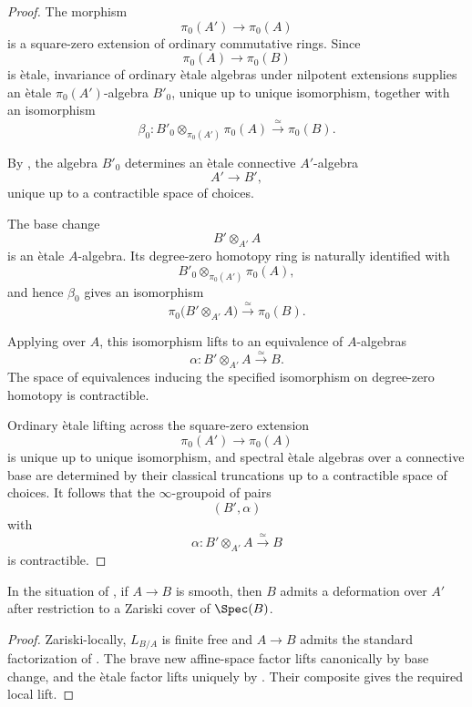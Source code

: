 \begin{proof}
The morphism
\[
    \pi_0(A')
    \longrightarrow
    \pi_0(A)
\]
is a square-zero extension of ordinary commutative rings. Since
\[
    \pi_0(A)
    \longrightarrow
    \pi_0(B)
\]
is \`etale, invariance of ordinary \`etale algebras under nilpotent
extensions supplies an \`etale \(\pi_0(A')\)-algebra \(B'_0\), unique up
to unique isomorphism, together with an isomorphism
\[
    \beta_0
    \colon
    B'_0
    \otimes_{\pi_0(A')}
    \pi_0(A)
    \xrightarrow{\simeq}
    \pi_0(B).
\]

By
,
the algebra \(B'_0\) determines an \`etale connective \(A'\)-algebra
\[
    A'
    \longrightarrow
    B',
\]
unique up to a contractible space of choices.

The base change
\[
    B'\otimes_{A'}A
\]
is an \`etale \(A\)-algebra. Its degree-zero homotopy ring is naturally
identified with
\[
    B'_0
    \otimes_{\pi_0(A')}
    \pi_0(A),
\]
and hence \(\beta_0\) gives an isomorphism
\[
    \pi_0
    \bigl(
        B'\otimes_{A'}A
    \bigr)
    \xrightarrow{\simeq}
    \pi_0(B).
\]

Applying
over \(A\), this isomorphism lifts to an equivalence of \(A\)-algebras
\[
    \alpha
    \colon
    B'\otimes_{A'}A
    \xrightarrow{\simeq}
    B.
\]
The space of equivalences inducing the specified isomorphism on
degree-zero homotopy is contractible.

Ordinary \`etale lifting across the square-zero extension
\[
    \pi_0(A')
    \longrightarrow
    \pi_0(A)
\]
is unique up to unique isomorphism, and spectral \`etale algebras over a
connective base are determined by their classical truncations up to a
contractible space of choices. It follows that the \(\infty\)-groupoid
of pairs
\[
    (B',\alpha)
\]
with
\[
    \alpha
    \colon
    B'\otimes_{A'}A
    \xrightarrow{\simeq}
    B
\]
is contractible.
\end{proof}

\begin{corollary}
\label{cor:local-lifting-smooth-algebras}
In the situation of , if $A\to B$ is
smooth, then $B$ admits a deformation over $A'$ after restriction to a
Zariski cover of $\Spec(B)$.
\end{corollary}

\begin{proof}
Zariski-locally, $L_{B/A}$ is finite free and $A\to B$ admits the standard
factorization of . The brave new
affine-space factor lifts canonically by base change, and the \`etale
factor lifts uniquely by . Their composite
gives the required local lift.
\end{proof}

